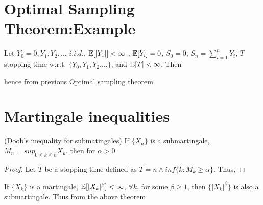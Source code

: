 \documentclass[all-lectures.tex]{subfiles}
\begin{document}

\setcounter{section}{2}
\setcounter{subsection}{1}

\section*{}

\section{Optimal Sampling Theorem:Example}
\begin{exmp}
Let $Y_0 = 0, Y_1, Y_2, \dots$ $i.i.d.$, $\mathbb{E}[|Y_1|] < \infty$ , $\mathbb{E}[Y_i]= 0$,
$S_0 = 0$, $S_n = \sum_{i=1}^{n} Y_i$, $T$ stopping time w.r.t. $\{Y_0, Y_1, Y_2. \dots\}$, and  $\mathbb{E}[T]< \infty$. Then

hence from previous Optimal sampling theorem
\end{exmp}

\section{Martingale inequalities}
\begin{thm}(Doob's inequality for submatingales)
If $\{X_n\}$ is a submartingale, $M_n = sup_{0 \le k \le n} X_k$, then for $\alpha>0$
\end{thm}
\begin{proof}
Let $T$ be a stopping time defined as $T= n \wedge inf\{k:M_k \ge \alpha\}$.
Thus,
\end{proof}
If  $\{X_k\}$ is a martingale, $\mathbb{E}[|X_k|^\beta] < \infty$, $\forall k$, for some $\beta \ge 1$, then $\{|X_k|^\beta\}$ is also a submartingale. Thus from the above theorem
\end{document}
